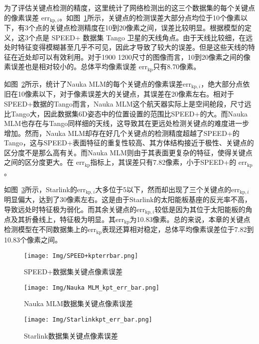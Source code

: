 为了评估关键点检测的精度，这里统计了网络检测出的这三个数据集的每个关键点的像素误差 $\text{err}_{\text{kp},i}$。如图~\ref{fig:SPEED+_kpts_err}所示，关键点的检测误差大部分点均位于10个像素以下，有3个点的关键点检测精度在10到20像素之间，误差比较明显。根据模型的定义，这3个点是 SPEED+ 数据集 Tango 卫星的天线角点。由于天线比较细，在远处时特征变得模糊甚至几乎不可见，因此才导致了较大的误差。但是这些天线的特征在近处却可以有效利用。对于1900 \times 1200尺寸的图像而言，10到20像素之间的像素误差也是相对较小的。总体平均像素误差 $\text{err}_{\text{kp}}$只有8.70像素。

如图~\ref{fig:Nauka_MLM_kpts_err}所示，统计了Nauka MLM的每个关键点的像素误差$\text{err}_{\text{kp},i}$，绝大部分点依旧在10像素以下，对于像素误差大的关键点，其误差在20像素左右。相对于SPEED+数据的Tango而言，Nauka MLM这个航天器实际上是空间舱段，尺寸远比Tango大，因此数据集6D姿态中的位置设置的范围比SPEED+的大。而Nauka MLM也存在与Tango同样细的天线，这导致其在更远处检测关键点的难度进一步增加。然而，Nauka MLM却存在好几个关键点的检测精度超越了SPEED+的Tango，这与SPEED+表面特征的重复性较高、其方体结构接近于极性、关键点的区分度不是那么高有关。而Nauka MLM则由于其表面更复杂的特征，使得关键点之间的区分度更大。在 $\text{err}_{\text{kp}}$指标上，其误差只有7.82像素，小于SPEED+的 $\text{err}_{\text{kp}}$。

如图~\ref{fig:Starlink_kpts_err}所示，Starlink的$\text{err}_{\text{kp},i}$大多位于5以下，然而却出现了三个关键点的$\text{err}_{\text{kp},i}$明显偏大，达到了30像素左右。这是由于Starlink的太阳能板基座的反光率不高，导致远处时特征极为弱化。而其余关键点的$\text{err}_{\text{kp},i}$较低是因为其位于太阳能板的角点及其折叠线上，特征极为明显。其$\text{err}_{\text{kp}}$为10.83像素。总的来说，本章的关键点检测模型在不同数据集上的$\text{err}_{\text{kp}}$表现还算相对稳定，总体平均像素误差位于7.82到10.83个像素之间。

\begin{figure}[htbp]
	\centering
	\texttt{[image: Img/SPEED+kpterrbar.png]}
	\caption{SPEED+数据集关键点像素误差}
	\label{fig:SPEED+_kpts_err}
	\vspace{-20pt}
\end{figure}
\begin{figure}[htbp]
	\centering
	\texttt{[image: Img/Nauka MLM\_kpt\_err\_bar.png]}
	\caption{Nauka MLM数据集关键点像素误差}
	\label{fig:Nauka_MLM_kpts_err}
\end{figure}
\begin{figure}[htbp]
	\centering
	\texttt{[image: Img/Starlinkkpt\_err\_bar.png]}
	\caption{Starlink数据集关键点像素误差}
	\label{fig:Starlink_kpts_err}
\end{figure}



